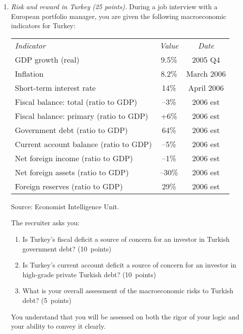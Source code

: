 \documentclass[letterpaper,12pt]{article}
\begin{document}
\begin{enumerate}
\item {\it Risk and reward in Turkey (25 points).}
During a job interview with a European portfolio manager,
you are given  the following macroeconomic indicators for Turkey:
\begin{center}
\begin{tabular}{lcc}
  {\it Indicator}  &  {\it Value}   & {\it Date}     \\
  GDP growth (real) &  9.5\%    & 2005 Q4     \\
  Inflation  &  8.2\%     & March 2006    \\
  Short-term interest rate &  14\%  &  April 2006 \\
  Fiscal balance:  total  (ratio to GDP) &  --3\%  & 2006 est\\
  Fiscal balance:  primary  (ratio to GDP) &  +6\%  & 2006 est \\
  Government debt (ratio to GDP) &  64\%  &  2006 est \\
  Current account balance (ratio to GDP)&  --5\%  &  2006 est \\
  Net foreign income (ratio to GDP)&  --1\%  &  2006 est \\
  Net foreign assets (ratio to GDP) &   --30\%   &   2006 est    \\
  Foreign reserves (ratio to GDP) &  29\%  & 2006 est \\
\end{tabular}
\end{center}
Source:  Economist Intelligence Unit.

The recruiter asks you:
\begin{enumerate}
\item Is Turkey's fiscal deficit a source of concern for
an investor in Turkish government debt?   (10~points)
\item Is Turkey's current account deficit a source of concern
for an investor in high-grade private Turkish debt?    (10~points)
\item What is your overall assessment of the
macroeconomic risks to Turkish debt?
(5~points)
\end{enumerate}
You understand that you will be assessed on both the rigor of your logic
and your ability to convey it clearly.



\end{enumerate}
\end{document}
